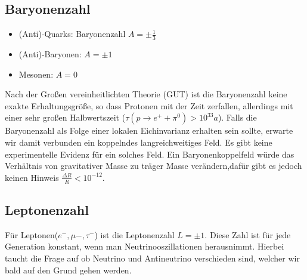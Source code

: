 \documentclass[Ex4_Zusammenfassung.tex]{subfiles}
\begin{document}
\subsection{Baryonenzahl}
\begin{itemize}
\item (Anti)-Quarks: Baryonenzahl $A = \pm \frac{1}{3}$
\item (Anti)-Baryonen: $A= \pm 1$
\item Mesonen: $A=0$ 
\end{itemize}
Nach der Großen vereinheitlichten Theorie (GUT) ist die Baryonenzahl keine exakte Erhaltungsgröße, so dass Protonen mit der Zeit zerfallen, allerdings mit einer sehr großen Halbwertszeit ($\tau(p \rightarrow e^+ + \pi^0) > 10^{33} a$).
Falls die Baryonenzahl als Folge einer lokalen Eichinvarianz erhalten sein sollte, erwarte wir damit verbunden ein koppelndes langreichweitiges Feld. Es gibt keine experimentelle Evidenz für ein solches Feld.
Ein Baryonenkoppelfeld würde das Verhältnis von gravitativer Masse zu träger Masse verändern,dafür gibt es jedoch keinen Hinweis $\frac{\Delta R}{R} < 10^{-12}$.

\subsection{Leptonenzahl}
Für Leptonen($e^-,\mu-,\tau^-$) ist die Leptonenzahl $L=\pm 1$. Diese Zahl ist für jede Generation konstant, wenn man Neutrinooszillationen herausnimmt. Hierbei taucht die Frage auf ob Neutrino und Antineutrino verschieden sind, welcher wir bald auf den Grund gehen werden.
\end{document}

